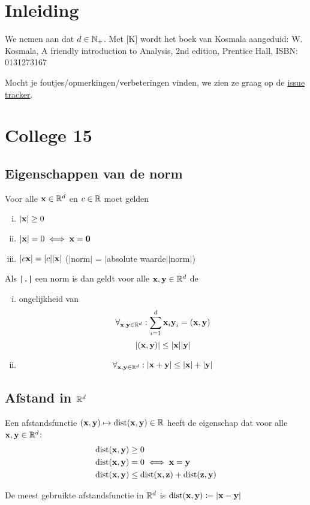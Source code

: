 \documentclass{2wa40summary}
\begin{document}
	\maketitle
	\thispagestyle{empty}
	\newpage
	
	\section{Inleiding}
	We nemen aan dat $d\in\mathbb{N}_+$. Met [K] wordt het boek van Kosmala aangeduid: W. Kosmala, A friendly introduction to Analysis, 2nd edition, Prentice Hall, ISBN: 0131273167
	
	Mocht je foutjes/opmerkingen/verbeteringen vinden, we zien ze graag op de \href{https://bitbucket.org/hollandpirates/analyse-2-samenvatting/issues?status=new&status=open}{issue tracker}.
	
	\section{College 15}
	\subsection{Eigenschappen van de norm}
	Voor alle ${\textbf{x}}\in \mathbb{R}^d$ en $c\in\mathbb{R}$ moet gelden
	\begin{enumerate}[(i)]
		\item $|{\textbf{x}}| \geq 0$
		\item ${\left|{\textbf{x}}\right|}=0 \iff {\textbf{x}}={\textbf{0}}$
		\item $|c{\textbf{x}}|=|c||{\textbf{x}}|$ ($|$norm$|$ = $|$absolute waarde$||$norm$|$)
	\end{enumerate}
	Als \verb#|.|# een norm is dan geldt voor alle ${\textbf{x}},{\textbf{y}}\in \mathbb{R}^d$ de
	\begin{enumerate}[(i)]
		\item ongelijkheid van 
		\[\forall_{{\textbf{x}},{\textbf{y}} \in \mathbb{R}^d}: \sum_{i=1}^{d}{\textbf{x}}_i {\textbf{y}}_i = ({\textbf{x}},{\textbf{y}})\]
		\[|({\textbf{x}},{\textbf{y}})| \leq |{\textbf{x}}||{\textbf{y}}|\]
		\item {}
		\[\forall_{{\textbf{x}},{\textbf{y}} \in \mathbb{R}^d}: |{\textbf{x}}+{\textbf{y}}|\leq |{\textbf{x}}|+|{\textbf{y}}|\]
	\end{enumerate}
	\subsection{Afstand in $\mathbb{R}^d$}
	\begin{define}[Afstandsfunctie]
		Een afstandsfunctie $({\textbf{x}},{\textbf{y}})\mapsto\operatorname{\mathop{dist}}({\textbf{x}},{\textbf{y}})\in\mathbb{R}$ heeft de eigenschap dat voor alle ${\textbf{x}},{\textbf{y}}\in\mathbb{R}^d$:
		\begin{align*}
		\operatorname{\mathop{dist}}({\textbf{x}},{\textbf{y}}) & \geq 0 \\
		\operatorname{\mathop{dist}}({\textbf{x}},{\textbf{y}}) & =0 \iff {\textbf{x}}={\textbf{y}} \\
		\operatorname{\mathop{dist}}({\textbf{x}},{\textbf{y}}) & \leq \operatorname{\mathop{dist}}({\textbf{x}},{\textbf{z}}) + \operatorname{\mathop{dist}}({\textbf{z}},{\textbf{y}})
		\end{align*}
	\end{define}
	De meest gebruikte afstandsfunctie  in $\mathbb{R}^d$ is $\operatorname{\mathop{dist}}({\textbf{x}},{\textbf{y}})\coloneqq |{\textbf{x}}-{\textbf{y}}|$
	
\end{document}
